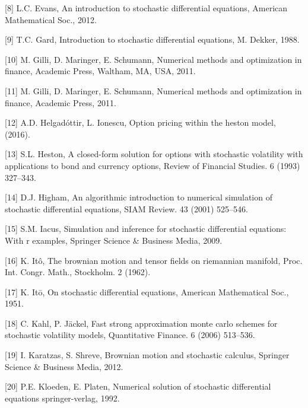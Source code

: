 \documentclass[12pt,twoside]{reedthesis}
\theoremstyle{definition}
\theoremstyle{definition}
\theoremstyle{remark}
\begin{document}
  \hypertarget{ref-evans}{}
  {[}8{]} L.C. Evans, An introduction to stochastic differential
  equations, American Mathematical Soc., 2012.
  
  \hypertarget{ref-gard1988}{}
  {[}9{]} T.C. Gard, Introduction to stochastic differential equations, M.
  Dekker, 1988.
  
  \hypertarget{ref-nmof}{}
  {[}10{]} M. Gilli, D. Maringer, E. Schumann, Numerical methods and
  optimization in finance, Academic Press, Waltham, MA, USA, 2011.
  
  \hypertarget{ref-gilli_numerical_2011}{}
  {[}11{]} M. Gilli, D. Maringer, E. Schumann, Numerical methods and
  optimization in finance, Academic Press, 2011.
  
  \hypertarget{ref-helgadottir2016option}{}
  {[}12{]} A.D. Helgadóttir, L. Ionescu, Option pricing within the heston
  model, (2016).
  
  \hypertarget{ref-heston1993closed}{}
  {[}13{]} S.L. Heston, A closed-form solution for options with stochastic
  volatility with applications to bond and currency options, Review of
  Financial Studies. 6 (1993) 327--343.
  
  \hypertarget{ref-higham2001}{}
  {[}14{]} D.J. Higham, An algorithmic introduction to numerical
  simulation of stochastic differential equations, SIAM Review. 43 (2001)
  525--546.
  
  \hypertarget{ref-iacus2009simulation}{}
  {[}15{]} S.M. Iacus, Simulation and inference for stochastic
  differential equations: With r examples, Springer Science \& Business
  Media, 2009.
  
  \hypertarget{ref-ito1962}{}
  {[}16{]} K. Itô, The brownian motion and tensor fields on riemannian
  manifold, Proc. Int. Congr. Math., Stockholm. 2 (1962).
  
  \hypertarget{ref-ito1951}{}
  {[}17{]} K. Itō, On stochastic differential equations, American
  Mathematical Soc., 1951.
  
  \hypertarget{ref-kahl2006fast}{}
  {[}18{]} C. Kahl, P. Jäckel, Fast strong approximation monte carlo
  schemes for stochastic volatility models, Quantitative Finance. 6 (2006)
  513--536.
  
  \hypertarget{ref-karatzas2012brownian}{}
  {[}19{]} I. Karatzas, S. Shreve, Brownian motion and stochastic
  calculus, Springer Science \& Business Media, 2012.
  
  \hypertarget{ref-kloeden1992}{}
  {[}20{]} P.E. Kloeden, E. Platen, Numerical solution of stochastic
  differential equations springer-verlag, 1992.
  
\end{document}
